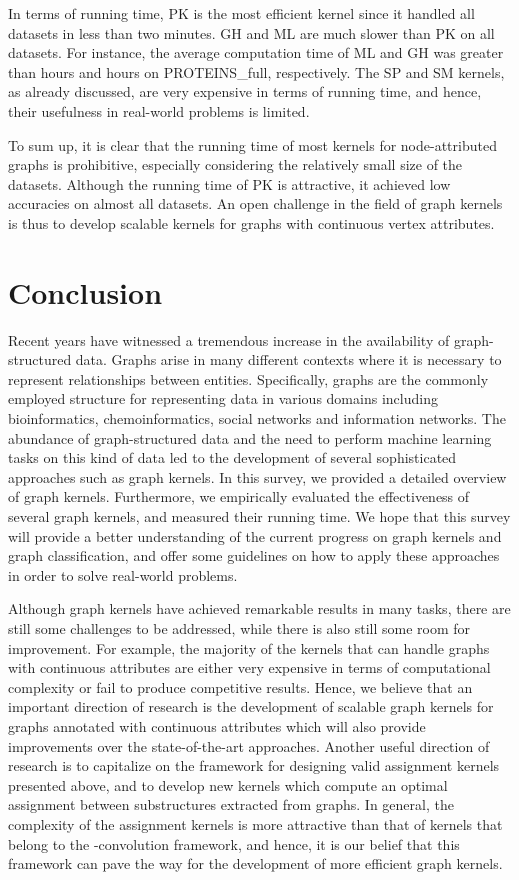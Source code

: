 \documentclass[twoside,11pt]{article}
\begin{document}
In terms of running time, PK is the most efficient kernel since it handled all datasets in less than two minutes.
GH and ML are much slower than PK on all datasets.
For instance, the average computation time of ML and GH was greater than  hours and  hours on PROTEINS\_full, respectively.
The SP and SM kernels, as already discussed, are very expensive in terms of running time, and hence, their usefulness in real-world problems is limited.

To sum up, it is clear that the running time of most kernels for node-attributed graphs is prohibitive, especially considering the relatively small size of the datasets.
Although the running time of PK is attractive, it achieved low accuracies on almost all datasets.
An open challenge in the field of graph kernels is thus to develop scalable kernels for graphs with continuous vertex attributes.



\section{Conclusion}\label{sec:conclusion}
Recent years have witnessed a tremendous increase in the availability of graph-structured data.
Graphs arise in many different contexts where it is necessary to represent relationships between entities.
Specifically, graphs are the commonly employed structure for representing data in various domains including bioinformatics, chemoinformatics, social networks and information networks.
The abundance of graph-structured data and the need to perform machine learning tasks on this kind of data led to the development of several sophisticated approaches such as graph kernels.
In this survey, we provided a detailed overview of graph kernels.
Furthermore, we empirically evaluated the effectiveness of several graph kernels, and measured their running time.
We hope that this survey will provide a better understanding of the current progress on graph kernels and graph classification, and offer some guidelines on how to apply these approaches in order to solve real-world problems.

Although graph kernels have achieved remarkable results in many tasks, there are still some challenges to be addressed, while there is also still some room for improvement.
For example, the majority of the kernels that can handle graphs with continuous attributes are either very expensive in terms of computational complexity or fail to produce competitive results.
Hence, we believe that an important direction of research is the development of scalable graph kernels for graphs annotated with continuous attributes which will also provide improvements over the state-of-the-art approaches.
Another useful direction of research is to capitalize on the framework for designing valid assignment kernels presented above, and to develop new kernels which compute an optimal assignment between substructures extracted from graphs.
In general, the complexity of the assignment kernels is more attractive than that of kernels that belong to the -convolution framework, and hence, it is our belief that this framework can pave the way for the development of more efficient graph kernels.


\vskip 0.2in


\end{document}
